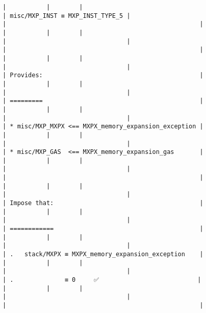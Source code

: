 \documentclass[varwidth=\maxdimen,margin=0.5cm,multi={verbatim}]{standalone}
\begin{document}
\begin{verbatim}
|           |        |                                                                     | misc/MXP_INST ≡ MXP_INST_TYPE_5 |                                   |                                                     |
|           |        |                                                                     |                                 |                                   |                                                     |
|           |        |                                                                     |                                 |                                   | Provides:                                           |
|           |        |                                                                     |                                 |                                   | =========                                           |
|           |        |                                                                     |                                 |                                   | * misc/MXP_MXPX <== MXPX_memory_expansion_exception |
|           |        |                                                                     |                                 |                                   | * misc/MXP_GAS  <== MXPX_memory_expansion_gas       |
|           |        |                                                                     |                                 |                                   |                                                     |
|           |        |                                                                     |                                 |                                   | Impose that:                                        |
|           |        |                                                                     |                                 |                                   | ============                                        |
|           |        |                                                                     |                                 |                                   | .   stack/MXPX ≡ MXPX_memory_expansion_exception    |
|           |        |                                                                     |                                 |                                   | .              ≡ 0     ✅                           |
|           |        |                                                                     |                                 |                                   |                                                     |

\end{verbatim}
\end{document}
